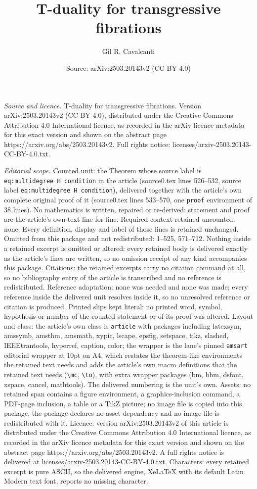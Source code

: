 \documentclass[10pt,a4paper]{amsart}
\title[T-duality for transgressive fibrations]{T-duality for transgressive fibrations}
\author{Gil R. Cavalcanti}
\date{Source: arXiv:2503.20143v2 (CC BY 4.0)}
\begin{document}
\maketitle

\noindent\emph{Source and licence.} T-duality for transgressive fibrations. Version arXiv:2503.20143v2 (CC BY 4.0), distributed under the Creative Commons Attribution 4.0 International licence, as recorded in the arXiv licence metadata for this exact version and shown on the abstract page https://arxiv.org/abs/2503.20143v2. Full rights notice: licenses/arxiv-2503.20143-CC-BY-4.0.txt.\par\smallskip

\noindent\textit{Editorial scope.} Counted unit: the Theorem whose source label is \texttt{eq:multidegree H condition} in the article (source0.tex lines 526--532, source label \texttt{eq:multidegree H condition}), delivered together with the article's own complete original proof of it (source0.tex lines 533--570, one \texttt{proof} environment of 38 lines). No mathematics is written, repaired or re-derived: statement and proof are the article's own text line for line. Required context retained uncounted: none. Every definition, display and label of those lines is retained unchanged. Omitted from this package and not redistributed: 1--525, 571--712. Nothing inside a retained excerpt is omitted or altered: every retained body is delivered exactly as the article's lines are written, so no omission receipt of any kind accompanies this package. Citations: the retained excerpts carry no citation command at all, so no bibliography entry of the article is transcribed and no reference is redistributed. Reference adaptation: none was needed and none was made; every reference inside the delivered unit resolves inside it, so no unresolved reference or citation is produced. Printed slips kept literal: no printed word, symbol, hypothesis or number of the counted statement or of its proof was altered. Layout and class: the article's own class is \texttt{article} with packages including latexsym, amssymb, amsthm, amsmath, xypic, lscape, epsfig, setspace, tikz, slashed, IEEEtrantools, hyperref, caption, color; the wrapper is the lane's pinned \texttt{amsart} editorial wrapper at 10pt on A4, which restates the theorem-like environments the retained text needs and adds the article's own macro definitions that the retained text needs (\texttt{\textbackslash mc}, \texttt{\textbackslash to}), with extra wrapper packages (bm, bbm, dsfont, xspace, cancel, mathtools). The delivered numbering is the unit's own. Assets: no retained span contains a figure environment, a graphics-inclusion command, a PDF-page inclusion, a table or a TikZ picture; no image file is copied into this package, the package declares no asset dependency and no image file is redistributed with it. Licence: version arXiv:2503.20143v2 of this article is distributed under the Creative Commons Attribution 4.0 International licence, as recorded in the arXiv licence metadata for this exact version and shown on the abstract page https://arxiv.org/abs/2503.20143v2. A full rights notice is delivered at licenses/arxiv-2503.20143-CC-BY-4.0.txt. Characters: every retained excerpt is pure ASCII, so the delivered engine, XeLaTeX with its default Latin Modern text font, reports no missing character.
\end{document}
